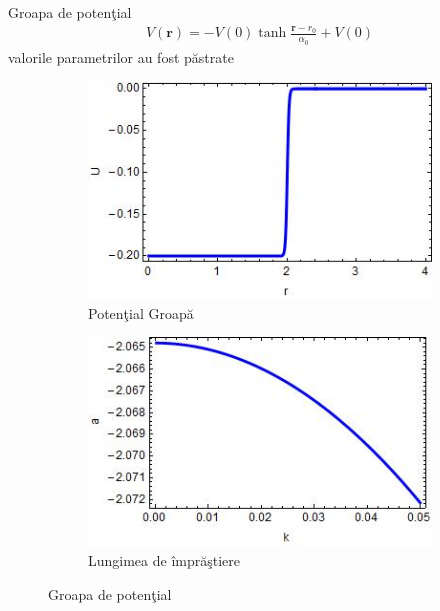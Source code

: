 \begin{frame}[allowframebreaks]{Groapa de poten\c{t}ial}
\begin{align}
V({\bm r})=-V(0)\tanh{\frac{{\bm r}-r_0}{\alpha_0}}+V(0)
\end{align}
valorile parametrilor au fost p\u{a}strate
\begin{figure}[h!]
\centering
\begin{subfigure}{.5\textwidth}
  \centering
  \includegraphics[width=0.9\linewidth]{PotentialGroapa}
  \caption{Poten\c{t}ial Groap\u{a}}
  \label{fig:sub321}
\end{subfigure}%
\begin{subfigure}{.5\textwidth}
  \centering
  \includegraphics[width=0.9\linewidth]{LungimeImprastiereGroapa}
  \caption{Lungimea de \^{i}mpr\u{a}\c{s}tiere}
  \label{fig:sub322}
\end{subfigure}
\caption{Groapa de poten\c{t}ial}
\label{fig:groapa}
\end{figure}
\end{frame}

